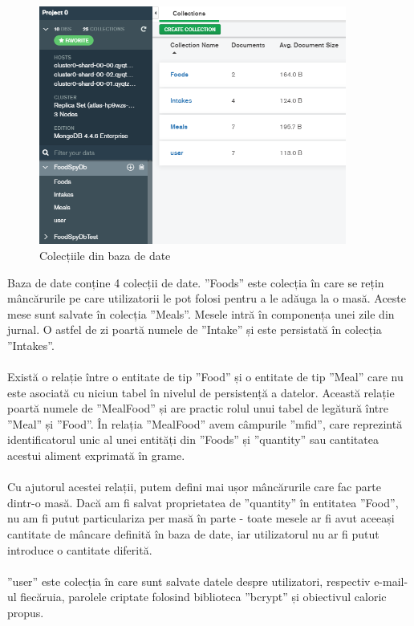 \begin{figure}[!htb]
	\centering
	\includegraphics[width=0.9\textwidth]
	{../LaTeX/Images/db_collections.PNG}
	\caption{Colecțiile din baza de date}
	\label{fig:629}
\end{figure}

Baza de date conține 4 colecții de date. ”Foods” este colecția în care se rețin mâncărurile pe care utilizatorii le pot folosi pentru a le adăuga la o masă. Aceste mese sunt salvate în colecția ”Meals”. Mesele intră în componența unei zile din jurnal. O astfel de zi poartă numele de ”Intake” și este persistată în colecția ”Intakes”.
\\ \\
Există o relație între o entitate de tip ”Food” și o entitate de tip ”Meal” care nu este asociată cu niciun tabel în nivelul de persistență a datelor. Această relație poartă numele de ”MealFood” și are practic rolul unui tabel de legătură între ”Meal” și ”Food”. În relația ”MealFood” avem câmpurile ”mfid”, care reprezintă identificatorul unic al unei entități din ”Foods” și ”quantity” sau cantitatea acestui aliment exprimată în grame.
\\ \\
Cu ajutorul acestei relații, putem defini mai ușor mâncărurile care fac parte dintr-o masă. Dacă am fi salvat proprietatea de ”quantity” în entitatea ”Food”, nu am fi putut particulariza per masă în parte - toate mesele ar fi avut aceeași cantitate de mâncare definită în baza de date, iar utilizatorul nu ar fi putut introduce o cantitate diferită.
\\ \\
”user” este colecția în care sunt salvate datele despre utilizatori, respectiv e-mail-ul fiecăruia, parolele criptate folosind biblioteca ”bcrypt” și obiectivul caloric propus.